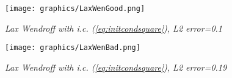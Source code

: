 \begin{figure}[H]
	\begin{center}
		\texttt{[image: graphics/LaxWenGood.png]}
	\end{center}%
	\caption[LaxWen]{ \em Lax Wendroff with i.c. (\ref{eq:initcondsquare}), L2 error=0.1}
	\label{fig:laxgood}
\end{figure}

\begin{figure}[H]
	\begin{center}
		\texttt{[image: graphics/LaxWenBad.png]}
	\end{center}%
	\caption[LaxWen]{ \em Lax Wendroff with i.c. (\ref{eq:initcondsquare}), L2 error=0.19}
	\label{fig:laxbad}
\end{figure}
